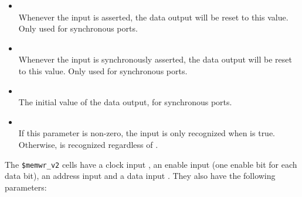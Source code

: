 \begin{itemize}
\item {} \\
Whenever the  input is asserted, the data output will be reset to this value.
Only used for synchronous ports.

\item {} \\
Whenever the  input is synchronously asserted, the data output will be reset to this value.
Only used for synchronous ports.

\item {} \\
The initial value of the data output, for synchronous ports.

\item {} \\
If this parameter is non-zero, the  input is only recognized when  is true.
Otherwise,  is recognized regardless of .
\end{itemize}

The {\tt \$memwr\_v2} cells have a clock input , an enable input  (one
enable bit for each data bit), an address input  and a data input
. They also have the following parameters:

